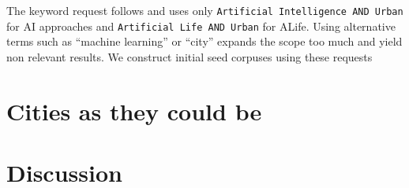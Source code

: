\documentclass[letterpaper]{article}
\begin{document}

The keyword request follows \cite{niu2016global} and uses only \texttt{Artificial Intelligence AND Urban} for AI approaches and \texttt{Artificial Life AND Urban} for ALife. Using alternative terms such as ``machine learning'' or ``city'' expands the scope too much and yield non relevant results.
We construct initial seed corpuses using these requests
%



\section{Cities as they could be}








\section{Discussion}

%




\footnotesize

\end{document}
